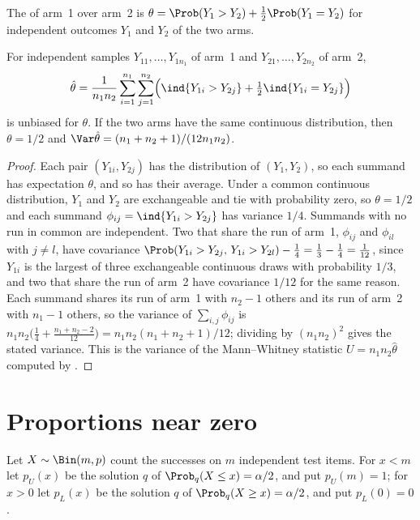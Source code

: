 \begin{refsection}
The  of arm~1 over arm~2 is $\theta=\Prob(Y_1>Y_2)+\frac12\Prob(Y_1=Y_2)$ for independent outcomes $Y_1$ and $Y_2$ of the two arms.

\begin{proposition}\label{thm:toolkit:mannwhitney}
For independent samples $Y_{11},\dots,Y_{1n_1}$ of arm~1 and $Y_{21},\dots,Y_{2n_2}$ of arm~2,
\[
\hat\theta=\frac1{n_1n_2}\sum_{i=1}^{n_1}\sum_{j=1}^{n_2}\Bigl(\ind\{Y_{1i}>Y_{2j}\}+\tfrac12\ind\{Y_{1i}=Y_{2j}\}\Bigr)
\]
is unbiased for $\theta$. If the two arms have the same continuous distribution, then $\theta=1/2$ and $\Var\hat\theta=(n_1+n_2+1)/(12n_1n_2)$.
\end{proposition}

\begin{proof}
Each pair $(Y_{1i},Y_{2j})$ has the distribution of $(Y_1,Y_2)$, so each summand has expectation $\theta$, and so has their average. Under a common continuous distribution, $Y_1$ and $Y_2$ are exchangeable and tie with probability zero, so $\theta=1/2$ and each summand $\phi_{ij}=\ind\{Y_{1i}>Y_{2j}\}$ has variance $1/4$. Summands with no run in common are independent. Two that share the run of arm~1, $\phi_{ij}$ and $\phi_{il}$ with $j\ne l$, have covariance $\Prob(Y_{1i}>Y_{2j},\,Y_{1i}>Y_{2l})-\frac14=\frac13-\frac14=\frac1{12}$, since $Y_{1i}$ is the largest of three exchangeable continuous draws with probability $1/3$, and two that share the run of arm~2 have covariance $1/12$ for the same reason. Each summand shares its run of arm~1 with $n_2-1$ others and its run of arm~2 with $n_1-1$ others, so the variance of $\sum_{i,j}\phi_{ij}$ is $n_1n_2\bigl(\frac14+\frac{n_1+n_2-2}{12}\bigr)=n_1n_2(n_1+n_2+1)/12$; dividing by $(n_1n_2)^2$ gives the stated variance. This is the variance of the Mann--Whitney statistic $U=n_1n_2\hat\theta$ computed by \textcite{MannWhitney1947}.
\end{proof}

\section{Proportions near zero}\label{sec:toolkit:binomial}

Let $X\sim\Bin(m,p)$ count the successes on $m$ independent test items. For $x<m$ let $p_U(x)$ be the solution $q$ of $\Prob_q(X\le x)=\alpha/2$, and put $p_U(m)=1$; for $x>0$ let $p_L(x)$ be the solution $q$ of $\Prob_q(X\ge x)=\alpha/2$, and put $p_L(0)=0$.


\end{refsection}
